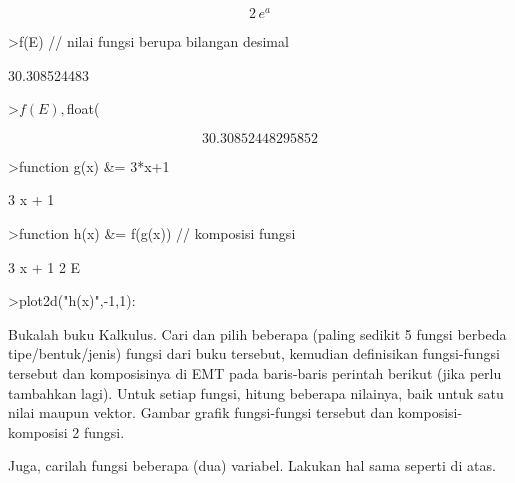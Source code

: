 \documentclass[a4paper,10pt]{article}
\begin{document}
\begin{eulernotebook}
\begin{eulercomment}
\begin{eulercomment}
\begin{eulercomment}
\begin{eulercomment}
\begin{eulercomment}
\begin{eulercomment}
\begin{euleroutput}
\end{euleroutput}
\begin{eulerformula}
\[
2\,e^{a}
\]
\end{eulerformula}
\begin{eulerprompt}
>f(E) // nilai fungsi berupa bilangan desimal
\end{eulerprompt}
\begin{euleroutput}
  30.308524483
\end{euleroutput}
\begin{eulerprompt}
>$f(E), $float(%
\end{eulerprompt}
\begin{eulerformula}
\[
30.30852448295852
\]
\end{eulerformula}
\begin{eulerprompt}
>function g(x) &= 3*x+1
\end{eulerprompt}
\begin{euleroutput}
  
                                 3 x + 1
  
\end{euleroutput}
\begin{eulerprompt}
>function h(x) &= f(g(x)) // komposisi fungsi
\end{eulerprompt}
\begin{euleroutput}
  
                                   3 x + 1
                                2 E
  
\end{euleroutput}
\begin{eulerprompt}
>plot2d("h(x)",-1,1):
\end{eulerprompt}
\begin{eulercomment}
Bukalah buku Kalkulus. Cari dan pilih beberapa (paling sedikit 5
fungsi berbeda tipe/bentuk/jenis) fungsi dari buku tersebut, kemudian
definisikan fungsi-fungsi tersebut dan komposisinya di EMT pada
baris-baris perintah berikut (jika perlu tambahkan lagi). Untuk setiap
fungsi, hitung beberapa nilainya, baik untuk satu nilai maupun vektor.
Gambar grafik fungsi-fungsi tersebut dan komposisi-komposisi 2 fungsi.

Juga, carilah fungsi beberapa (dua) variabel. Lakukan hal sama seperti
di atas.


\end{eulercomment}
\end{eulercomment}
\end{eulercomment}
\end{eulercomment}
\end{eulercomment}
\end{eulercomment}
\end{eulercomment}
\end{eulernotebook}
\end{document}
